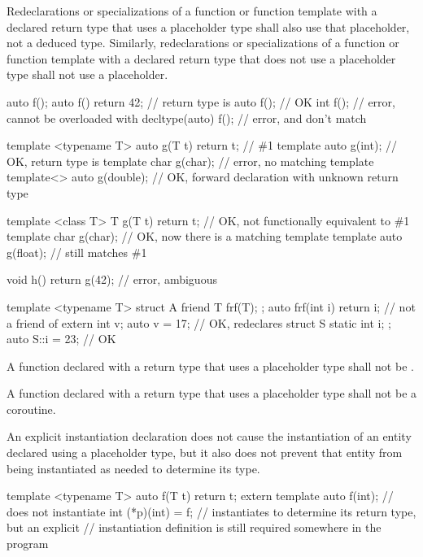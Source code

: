 \pnum
Redeclarations or specializations of a function or function template with a
declared return type that uses a placeholder type shall also use that
placeholder, not a deduced type.
Similarly,
redeclarations or specializations of a function or function template with a
declared return type that does not use a placeholder type
shall not use a placeholder.
\begin{example}
\begin{codeblock}
auto f();
auto f() { return 42; }                         // return type is 
auto f();                                       // OK
int f();                                        // error, cannot be overloaded with 
decltype(auto) f();                             // error,  and  don't match

template <typename T> auto g(T t) { return t; } // \#1
template auto g(int);                           // OK, return type is 
template char g(char);                          // error, no matching template
template<> auto g(double);                      // OK, forward declaration with unknown return type

template <class T> T g(T t) { return t; }       // OK, not functionally equivalent to \#1
template char g(char);                          // OK, now there is a matching template
template auto g(float);                         // still matches \#1

void h() { return g(42); }                      // error, ambiguous

template <typename T> struct A {
  friend T frf(T);
};
auto frf(int i) { return i; }                   // not a friend of 
extern int v;
auto v = 17;                                    // OK, redeclares 
struct S {
  static int i;
};
auto S::i = 23;                                 // OK
\end{codeblock}
\end{example}

\pnum
A function declared with a return type that uses a placeholder type shall not
be .

\pnum
A function declared with a return type that uses a placeholder type shall not
be a coroutine.

\pnum
An explicit instantiation declaration does not cause the
instantiation of an entity declared using a placeholder type, but it also does
not prevent that entity from being instantiated as needed to determine its
type.
\begin{example}
\begin{codeblock}
template <typename T> auto f(T t) { return t; }
extern template auto f(int);    // does not instantiate 
int (*p)(int) = f;              // instantiates  to determine its return type, but an explicit
                                // instantiation definition is still required somewhere in the program
\end{codeblock}
\end{example}

